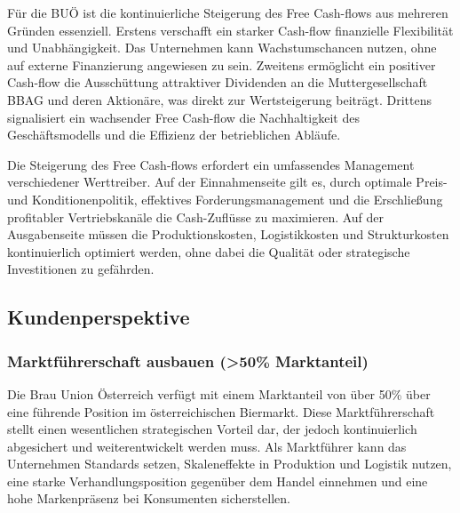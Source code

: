 Für die BUÖ ist die kontinuierliche Steigerung des Free Cash-flows aus mehreren Gründen essenziell. Erstens verschafft ein starker Cash-flow finanzielle Flexibilität und Unabhängigkeit. Das Unternehmen kann Wachstumschancen nutzen, ohne auf externe Finanzierung angewiesen zu sein. Zweitens ermöglicht ein positiver Cash-flow die Ausschüttung attraktiver Dividenden an die Muttergesellschaft BBAG und deren Aktionäre, was direkt zur Wertsteigerung beiträgt. Drittens signalisiert ein wachsender Free Cash-flow die Nachhaltigkeit des Geschäftsmodells und die Effizienz der betrieblichen Abläufe.  

Die Steigerung des Free Cash-flows erfordert ein umfassendes Management verschiedener Werttreiber. Auf der Einnahmenseite gilt es, durch optimale Preis- und Konditionenpolitik, effektives Forderungsmanagement und die Erschließung profitabler Vertriebskanäle die Cash-Zuflüsse zu maximieren. Auf der Ausgabenseite müssen die Produktionskosten, Logistikkosten und Strukturkosten kontinuierlich optimiert werden, ohne dabei die Qualität oder strategische Investitionen zu gefährden. 

\subsection{Kundenperspektive}

\subsubsection{Marktführerschaft ausbauen (>50\% Marktanteil)}
Die Brau Union Österreich verfügt mit einem Marktanteil von über 50\% über eine führende Position im österreichischen Biermarkt. Diese Marktführerschaft stellt einen wesentlichen strategischen Vorteil dar, der jedoch kontinuierlich abgesichert und weiterentwickelt werden muss. Als Marktführer kann das Unternehmen Standards setzen, Skaleneffekte in Produktion und Logistik nutzen, eine starke Verhandlungsposition gegenüber dem Handel einnehmen und eine hohe Markenpräsenz bei Konsumenten sicherstellen.

